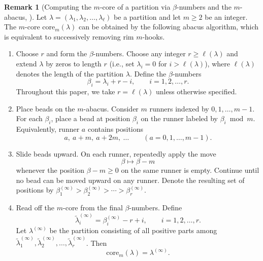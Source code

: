 \documentclass[preprint,3p,10pt]{elsarticle}
\theoremstyle{definition}
\newtheorem{remark}{Remark}[section]
\begin{document}
\begin{remark}[Computing the $m$-core of a partition via $\beta$-numbers and the $m$-abacus, \cite{james2006representation}]\label{rem:compute-m-core}
Let $\lambda=(\lambda_1,\lambda_2,\ldots,\lambda_\ell)$ be a partition and let $m\ge 2$ be an integer.
The $m$-core $\mathrm{core}_m(\lambda)$ can be obtained by the following abacus algorithm, which is equivalent to
successively removing rim $m$-hooks.

\begin{enumerate}[(Step 1)]
\item Choose $r$ and form the $\beta$-numbers.
Choose any integer $r\ge \ell(\lambda)$ and extend $\lambda$ by zeros to length $r$ (i.e., set $\lambda_i=0$ for $i>\ell(\lambda)$), where $\ell(\lambda)$ denotes the length of the partition $\lambda$.
Define the $\beta$-numbers
\begin{equation}\label{eq:beta-numbers-abacus}
\beta_i=\lambda_i+r-i,\qquad i=1,2,\ldots,r.
\end{equation}
Throughout this paper, we take $r=\ell(\lambda)$ unless otherwise specified.

\item Place beads on the $m$-abacus.
Consider $m$ runners indexed by $0,1,\ldots,m-1$.
For each $\beta_i$, place a bead at position $\beta_i$ on the runner labeled by $\beta_i \bmod m$.
Equivalently, runner $a$ contains positions
\[
a,\ a+m,\ a+2m,\ \ldots \qquad (a=0,1,\ldots,m-1).
\]



\item Slide beads upward.
On each runner, repeatedly apply the move
\[
\beta \longmapsto \beta-m
\]
whenever the position $\beta-m\ge 0$ on the same runner is empty.
Continue until no bead can be moved upward on any runner.
Denote the resulting set of positions by $\beta^{(\infty)}_1 > \beta^{(\infty)}_2 > \cdots > \beta^{(\infty)}_r.$

\item Read off the $m$-core from the final $\beta$-numbers.
Define
\begin{equation}
\tilde{\lambda}^{(\infty)}_i=\beta^{(\infty)}_i-r+i,\qquad i=1,2,\ldots,r.
\end{equation}
Let \(\lambda^{(\infty)}\) be the partition consisting of all positive parts among
\(\tilde{\lambda}^{(\infty)}_1,\tilde{\lambda}^{(\infty)}_2,\ldots,\tilde{\lambda}^{(\infty)}_r\).
Then
\begin{equation}\label{eq:core-from-final-beta}
    \mathrm{core}_m(\lambda)=\lambda^{(\infty)}.
\end{equation}
\end{enumerate}


\end{remark}
\end{document}
